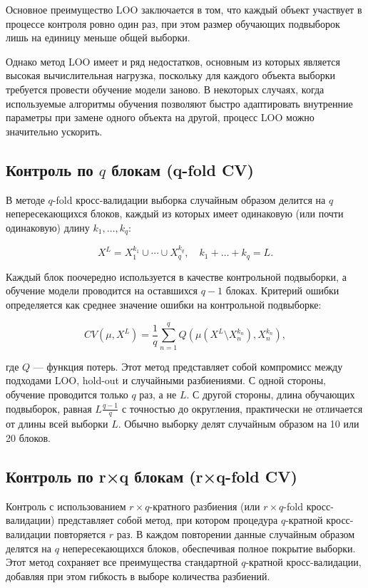 Основное преимущество LOO заключается в том, что каждый объект участвует в процессе контроля ровно один раз, при этом размер обучающих подвыборок лишь на единицу меньше общей выборки.

Однако метод LOO имеет и ряд недостатков, основным из которых является высокая вычислительная нагрузка, поскольку для каждого объекта выборки требуется провести обучение модели заново. В некоторых случаях, когда используемые алгоритмы обучения позволяют быстро адаптировать внутренние параметры при замене одного объекта на другой, процесс LOO можно значительно ускорить.

\subsection{Контроль по \( q \) блокам (q-fold CV)}

В методе \( q \)-fold кросс-валидации выборка случайным образом делится на \( q \) непересекающихся блоков, каждый из которых имеет одинаковую (или почти одинаковую) длину \( k_1, \ldots, k_q \):

\[
X^L = X^{k_1}_1 \cup \cdots \cup X^{k_q}_q, \quad k_1 + \dots + k_q = L.
\]

Каждый блок поочередно используется в качестве контрольной подвыборки, а обучение модели проводится на оставшихся \( q-1 \) блоках. Критерий ошибки определяется как среднее значение ошибки на контрольной подвыборке:

\[
CV(\mu, X^L) = \frac{1}{q} \sum_{n=1}^q Q \left( \mu \left( X^L \setminus X^{k_n}_n \right), X^{k_n}_n \right),
\]

где \( Q \) — функция потерь. Этот метод представляет собой компромисс между подходами LOO, hold-out и случайными разбиениями. С одной стороны, обучение проводится только \( q \) раз, а не \( L \). С другой стороны, длина обучающих подвыборок, равная \( L \frac{q-1}{q} \) с точностью до округления, практически не отличается от длины всей выборки \( L \). Обычно выборку делят случайным образом на 10 или 20 блоков.

\subsection{Контроль по r×q блокам (r×q-fold CV)}
Контроль с использованием \(r \times q\)-кратного разбиения (или \(r \times q\)-fold кросс-валидации) представляет собой метод, при котором процедура \(q\)-кратной кросс-валидации повторяется \(r\) раз. В каждом повторении данные случайным образом делятся на \(q\) непересекающихся блоков, обеспечивая полное покрытие выборки. Этот метод сохраняет все преимущества стандартной \(q\)-кратной кросс-валидации, добавляя при этом гибкость в выборе количества разбиений.

